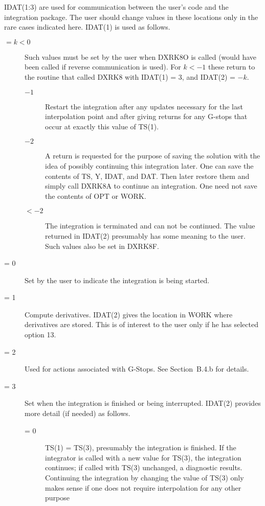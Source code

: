 \documentclass[twoside]{MATH77}
\begin{document}
IDAT(1:3) are used for communication between the user's code and
the integration package.  The user should change values in these locations
only in the rare cases indicated here.  IDAT(1) is used as follows.
\vspace{-8pt}
\begin{description}
\item[$= k < 0$] Such values must be set by the user when DXRK8O is
  called (would have been called if reverse communication is used).
  For $k < -1$ these return to the routine that called DXRK8 with
  IDAT(1) = 3, and IDAT(2) = $-k$.
  \begin{description}
  \item[$-1$] Restart the integration after any updates necessary for
    the last interpolation point and after giving returns for any
    G-stops that occur at exactly this value of TS(1).
  \item[$-2$] A return is requested for the purpose of saving the
    solution with the idea of possibly continuing this integration
    later.  One can save the contents of TS, Y, IDAT, and DAT.  Then
    later restore them and simply call DXRK8A to continue an
    integration.  One need not save the contents of OPT or WORK.
  \item[$< -2$] The integration is terminated and can not be
    continued.  The value returned in IDAT(2) presumably has some
    meaning to the user.  Such values also be set in DXRK8F.
  \end{description}
\item[= 0]  Set by the user to indicate the integration is being started.
\item[= 1]  Compute derivatives.  IDAT(2) gives the location in
WORK where derivatives are stored.  This is of interest to the user only
if he has selected option 13.
\item[= 2]  Used for actions associated with G-Stops.  See Section~B.4.b
for details.
\item[= 3]  Set when the integration is finished or being interrupted.
IDAT(2) provides more detail (if needed) as follows.
\begin{description}
\item[= 0] TS(1) = TS(3), presumably the integration is finished.  If
  the integrator is called with a new value for TS(3), the integration
  continues; if called with TS(3) unchanged, a diagnostic results.
  Continuing the integration by changing the value of TS(3) only makes
  sense if one does not require interpolation for any other purpose

\end{description}
\end{description}
\end{document}
